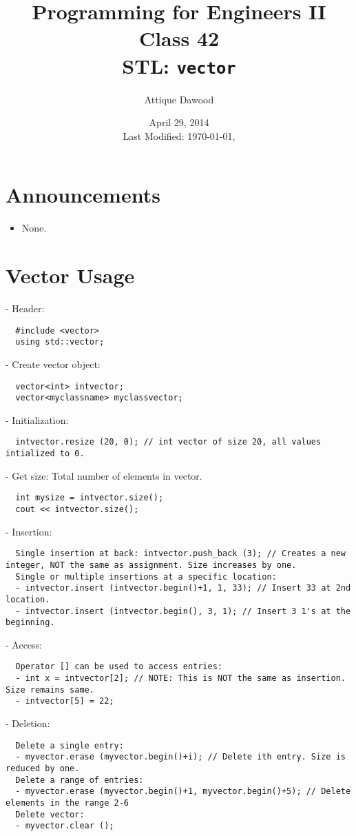 \documentclass[12pt,a4paper]{article}
\title{\vspace{-2cm}Programming for Engineers II\\Class 42\\STL: \texttt{vector}}
\author{Attique Dawood}
\date{April 29, 2014\\[0.2cm] Last Modified: \today, \currenttime}
\begin{document}
\maketitle
\section{Announcements}
\begin{itemize}
\item None.
\end{itemize}
\section{Vector Usage}
- Header:
\begin{verbatim}
  #include <vector>
  using std::vector;
\end{verbatim}
- Create vector object:
\begin{verbatim}
  vector<int> intvector;
  vector<myclassname> myclassvector;
\end{verbatim}
- Initialization:
\begin{verbatim}
  intvector.resize (20, 0); // int vector of size 20, all values intialized to 0.
\end{verbatim}
- Get size: Total number of elements in vector.
\begin{verbatim}
  int mysize = intvector.size();
  cout << intvector.size(); 
\end{verbatim}
- Insertion:
\begin{verbatim}
  Single insertion at back: intvector.push_back (3); // Creates a new integer, NOT the same as assignment. Size increases by one.
  Single or multiple insertions at a specific location:
  - intvector.insert (intvector.begin()+1, 1, 33); // Insert 33 at 2nd location.
  - intvector.insert (intvector.begin(), 3, 1); // Insert 3 1's at the beginning.
\end{verbatim}
- Access:
\begin{verbatim}
  Operator [] can be used to access entries:
  - int x = intvector[2]; // NOTE: This is NOT the same as insertion. Size remains same.
  - intvector[5] = 22;
\end{verbatim}
- Deletion:
\begin{verbatim}
  Delete a single entry: 
  - myvector.erase (myvector.begin()+i); // Delete ith entry. Size is reduced by one.
  Delete a range of entries: 
  - myvector.erase (myvector.begin()+1, myvector.begin()+5); // Delete elements in the range 2-6
  Delete vector:
  - myvector.clear ();
\end{verbatim}
\end{document}

